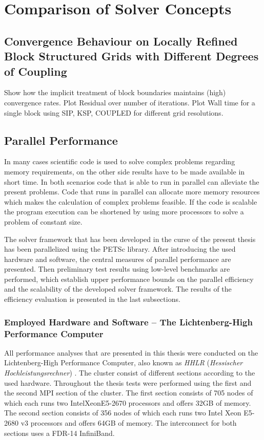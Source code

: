   \section{Comparison of Solver Concepts}
  
     \subsection{Convergence Behaviour on Locally Refined Block Structured Grids with Different Degrees of Coupling}

      Show how the implicit treatment of block boundaries maintains (high) convergence rates. Plot Residual over number of iterations. Plot Wall time for a single block using SIP, KSP, COUPLED for different grid resolutions.

\subsection{Parallel Performance}

In many cases scientific code is used to solve complex problems regarding memory requirements, on the other side results have to be made available in short time. In both scenarios code that is able to run in parallel can alleviate the present problems. Code that runs in parallel can allocate more memory resources which makes the calculation of complex problems feasible. If the code is scalable the program execution can be shortened by using more processors to solve a problem of constant size.

The solver framework that has been developed in the curse of the present thesis has been parallelized using the PETSc library. After introducing the used hardware and software, the central measures of parallel performance are presented. Then preliminary test results using low-level benchmarks are performed, which establish upper performance bounds on the parallel efficiency and the scalability of the developed solver framework. The results of the efficiency evaluation is presented in the last subsections.
\subsubsection{Employed Hardware and Software -- The Lichtenberg-High Performance Computer }

All performance analyses that are presented in this thesis were conducted on the Lichtenberg-High Performance Computer, also known as \emph{HHLR} (\emph{Hessischer Hochleistungsrechner}) \cite{hhlr}. The cluster consist of different sections according to the used hardware. Throughout the thesis tests were performed using the first and the second MPI section of the cluster. The first section consists of 705 nodes of which each runs two Intel\textregistered Xeon\textregistered E5-2670 processors and offers 32GB of memory. The second section consists of 356 nodes of which each runs two Intel Xeon E5-2680 v3 processors and offers 64GB of memory. The interconnect for both sections uses a FDR-14 InfiniBand.


